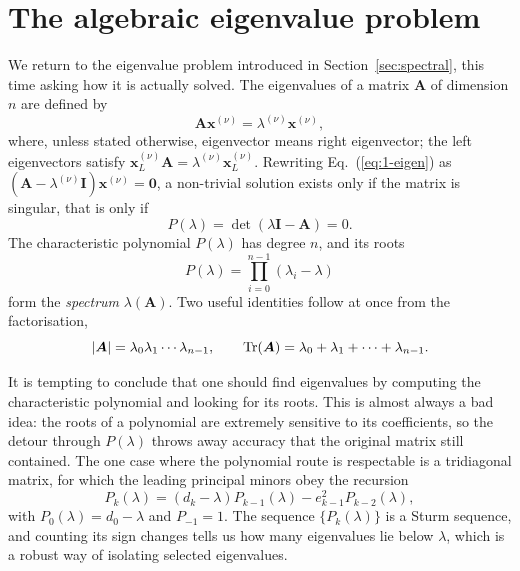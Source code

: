 
\section{The algebraic eigenvalue problem}
\label{sec:eigenproblem}

We return to the eigenvalue problem introduced in
Section~\ref{sec:spectral}, this time asking how it is actually solved.  The
eigenvalues of a matrix $\bm{A}$ of dimension $n$ are defined by
\begin{equation}
  \bm{A}\bm{x}^{(\nu)} = \lambda^{(\nu)}\bm{x}^{(\nu)},
  \label{eq:1-eigen}
\end{equation}
where, unless stated otherwise, eigenvector means right eigenvector; the left
eigenvectors satisfy $\bm{x}_L^{(\nu)}\bm{A}=\lambda^{(\nu)}\bm{x}_L^{(\nu)}$.
Rewriting Eq.~(\ref{eq:1-eigen}) as
$(\bm{A}-\lambda^{(\nu)}\bm{I})\bm{x}^{(\nu)}=\bm{0}$, a non-trivial solution
exists only if the matrix is singular, that is only if
\begin{equation}
  P(\lambda) = \det(\lambda\bm{I}-\bm{A}) = 0 .
  \label{eq:1-charpoly}
\end{equation}
The characteristic polynomial $P(\lambda)$ has degree $n$, and its roots
\begin{equation}
  P(\lambda) = \prod_{i=0}^{n-1}(\lambda_i-\lambda)
  \label{eq:1-charfactor}
\end{equation}
form the \emph{spectrum} $\lambda(\bm{A})$.  Two useful identities follow at
once from the factorisation,
\begin{equation}
  {|\boldsymbol{A}|} = \lambda_0\lambda_1\cdots\lambda_{n-1},
  \qquad
  \mathrm{Tr}(\bm{A}) = \lambda_0+\lambda_1+\dots+\lambda_{n-1} .
  \label{eq:1-dettrace}
\end{equation}

It is tempting to conclude that one should find eigenvalues by computing the
characteristic polynomial and looking for its roots.  This is almost always a
bad idea: the roots of a polynomial are extremely sensitive to its
coefficients, so the detour through $P(\lambda)$ throws away accuracy that the
original matrix still contained.  The one case where the polynomial route is
respectable is a tridiagonal matrix, for which the leading principal minors
obey the recursion
\begin{equation}
  P_k(\lambda) = (d_k-\lambda)P_{k-1}(\lambda) - e_{k-1}^2 P_{k-2}(\lambda),
  \label{eq:1-sturm}
\end{equation}
with $P_0(\lambda)=d_0-\lambda$ and $P_{-1}=1$.  The sequence
$\{P_k(\lambda)\}$ is a Sturm sequence, and counting its sign changes tells us
how many eigenvalues lie below $\lambda$, which is a robust way of isolating
selected eigenvalues.

